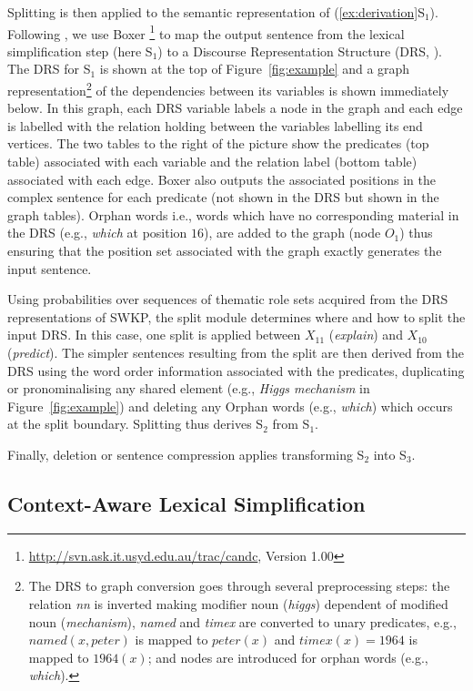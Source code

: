 \documentclass[11pt,a4paper]{article}
\newcommand{\nlang}[1]{{\it #1}}
\begin{document}
Splitting is then applied to the semantic representation of
(\ref{ex:derivation}S$_1$). Following , we
use Boxer \footnote{\url{http://svn.ask.it.usyd.edu.au/trac/candc},
  Version 1.00} \cite{curran2007linguistically} to map the output
sentence from the lexical simplification step (here S$_1$) to a
Discourse Representation Structure (DRS, \cite{kamp81}). The DRS for
S$_1$ is shown at the top of Figure~\ref{fig:example} and a graph
representation\footnote{The DRS to graph conversion goes through
  several preprocessing steps: the relation \emph{nn} is inverted
  making modifier noun (\emph{higgs}) dependent of modified noun
  (\emph{mechanism}), \emph{named} and \emph{timex} are converted to
  unary predicates, e.g., $named(x,peter)$ is mapped to $peter(x)$ and
  $timex(x)=1964$ is mapped to $1964(x)$; and nodes are introduced for
  orphan words (e.g., \emph{which}).} of the dependencies between its
variables is shown immediately below.  In this graph, each DRS
variable labels a node in the graph and each edge is labelled with the
relation holding between the variables labelling its end vertices. The
two tables to the right of the picture show the predicates (top table)
associated with each variable and the relation label (bottom table)
associated with each edge. Boxer also outputs the associated positions
in the complex sentence for each predicate (not shown in the DRS but
shown in the graph tables). Orphan words i.e., words which have no
corresponding material in the DRS (e.g., \emph{which} at position
$16$), are added to the graph (node $O_1$) thus ensuring that the
position set associated with the graph exactly generates the input
sentence.

Using probabilities over sequences of thematic role sets acquired from
the DRS representations of SWKP, the split module determines where and
how to split the input DRS. In this case, one split is applied between
$X_{11}$ (\nlang{explain}) and $X_{10}$ (\nlang{predict}).  The
simpler sentences resulting from the split are then derived from the
DRS using the word order information associated with the predicates,
duplicating or pronominalising any shared element (e.g., \nlang{Higgs
  mechanism} in Figure~\ref{fig:example}) and deleting any Orphan
words (e.g., \nlang{which}) which occurs at the split
boundary. Splitting thus derives S$_2$ from S$_1$.

Finally, deletion or sentence compression applies transforming S$_2$
into S$_3$.

\subsection{Context-Aware Lexical Simplification}
\label{subsec:lexicalsimplification}
\end{document}
